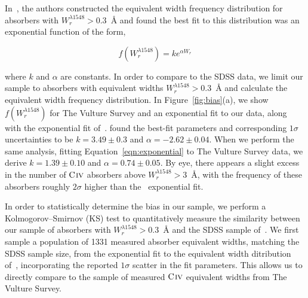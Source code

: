 \documentclass[linenumbers,twocolumn]{aastex61}
\begin{document}
In~\cite{Cooksey2013}, the authors constructed the equivalent width frequency distribution for absorbers with $W_r^{\lambda1548} > 0.3$~{\AA} and found the best fit to this distribution was an exponential function of the form,

\begin{equation}
f(W_r^{\lambda1548}) = k e^{\alpha W_r}
\label{eqn:exponential}
\end{equation}

\noindent where $k$ and $\alpha$ are constants. In order to compare to the SDSS data, we limit our sample to absorbers with equivalent widths $W_r^{\lambda1548} > 0.3$~{\AA} and calculate the equivalent width frequency distribution. In Figure~\ref{fig:bias}(a), we show $f(W_r^{\lambda1548})$ for The Vulture Survey and an exponential fit to our data, along with the exponential fit of~\cite{Cooksey2013}. \cite{Cooksey2013} found the best-fit parameters and corresponding $1\sigma$ uncertainties to be $k = 3.49 \pm 0.3$ and $\alpha = -2.62 \pm 0.04$. When we perform the same analysis, fitting Equation~\ref{eqn:exponential} to The Vulture Survey data, we derive $k = 1.39 \pm 0.10$ and $\alpha = 0.74 \pm 0.05$. By eye, there appears a slight excess in the number of ${\hbox{{\rm C}\kern 0.1em{\sc iv}}}$ absorbers above $W_r^{\lambda1548} > 3$~{\AA}, with the frequency of these absorbers roughly $2\sigma$ higher than the~\cite{Cooksey2013} exponential fit.

In order to statistically determine the bias in our sample, we perform a Kolmogorov--Smirnov (KS) test to quantitatively measure the similarity between our sample of absorbers with $W_r^{\lambda1548} > 0.3$~{\AA} and the SDSS sample of~\cite{Cooksey2013}. We first sample a population of 1331 measured absorber equivalent widths, matching the SDSS sample size, from the exponential fit to the equivalent width ditribution of~\cite{Cooksey2013}, incorporating the reported $1\sigma$ scatter in the fit parameters. This allows us to directly compare to the sample of measured ${\hbox{{\rm C}\kern 0.1em{\sc iv}}}$ equivalent widths from The Vulture Survey.
\end{document}
